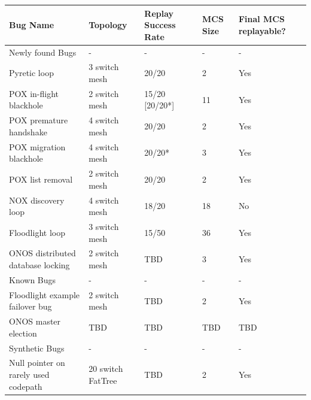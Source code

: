 \label{subsec:case_studies}

\begin{table}
\centering
\begin{tabular}{l|l|l|l|l|}
Bug Name & Topology & Replay Success Rate & MCS Size & Final MCS replayable? \\
\hline
Newly found Bugs & - & - & - & - \\
\hline
Pyretic loop & 3 switch mesh & 20/20 & 2 & Yes \\
POX in-flight blackhole & 2 switch mesh & 15/20 [20/20*] & 11 & Yes \\
POX premature handshake & 4 switch mesh & 20/20 & 2 & Yes \\
POX migration blackhole & 4 switch mesh & 20/20* & 3 & Yes \\
POX list removal & 2 switch mesh & 20/20 & 2 & Yes \\
NOX discovery loop & 4 switch mesh & 18/20 & 18 & No \\
Floodlight loop & 3 switch mesh & 15/50 & 36 & Yes \\
ONOS distributed database locking & 2 switch mesh & TBD & 3 & Yes \\
\hline
Known Bugs & - & - & - & - \\
\hline
Floodlight example failover bug & 2 switch mesh & TBD & 2 & Yes \\
ONOS master election & TBD & TBD & TBD & TBD \\
\hline
Synthetic Bugs & - & - & - & - \\
\hline
Null pointer on rarely used codepath & 20 switch FatTree & TBD & 2 & Yes \\

\end{tabular}
\end{table}
